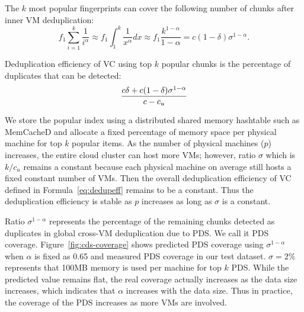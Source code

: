 The  $k$ most popular fingerprints can cover the following number of chunks after inner VM 
deduplication:
\[
f_1 \sum_{i=1}^{k}\frac{1}{i^\alpha} \approx  
f_1 \int_{1}^{k}\frac{1}{x^\alpha} dx  \approx  f_1\frac{  k^{1-\alpha}} {1-\alpha}
=c(1-\delta) \sigma^{1-\alpha}.
\]

Deduplication efficiency of VC using top $k$ popular chunks
is the percentage of duplicates that can be detected:  
\begin{equation}
\label{eq:dedupeff}
\frac{ c\delta + c(1-\delta) \sigma^{1-\alpha}}
{c  - c_u }\\
\end{equation}

We store the popular index using a distributed shared memory hashtable such as MemCacheD
and allocate a fixed percentage of memory space   per physical machine for top $k$ popular items.
As the number of physical machines ($p$) increases,
the entire cloud cluster can host more VMs; however,  ratio $\sigma$ which is $k/c_u$ remains
a constant because each physical machine on average still hosts a fixed constant number of 
VMs. Then the overall deduplication efficiency of VC defined in Formula~\ref{eq:dedupeff}
remains to be a constant.
Thus the deduplication efficiency is stable  as $p$ increases as long as $\sigma$  is a constant.

Ratio $\sigma^{1-\alpha}$ represents the percentage of the remaining
chunks detected as duplicates in global cross-VM deduplication due to PDS.
We call it PDS coverage.
Figure~\ref{fig:cds-coverage} shows predicted PDS coverage using $\sigma^{1-\alpha}$ when $\alpha$ is fixed as
0.65 and measured PDS coverage in our test dataset.
$\sigma=2\%$ represents that 100MB memory is used per machine for top $k$ PDS.
While the predicted value remains flat, the  real coverage actually increases as the data size
increases, which indicates that $\alpha$ increases with the data size. 
Thus in practice, the coverage of the PDS increases as more VMs are involved.

